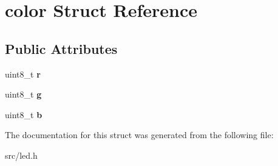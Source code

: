 \hypertarget{structcolor}{}\section{color Struct Reference}
\label{structcolor}
\subsection*{Public Attributes}
\begin{DoxyCompactItemize}
\item 
\hypertarget{structcolor_a7293811e057a838135d916809d231b05}{}uint8\+\_\+t {\bfseries r}\label{structcolor_a7293811e057a838135d916809d231b05}

\item 
\hypertarget{structcolor_ae81805dcec6033d1efa8e2721baee60e}{}uint8\+\_\+t {\bfseries g}\label{structcolor_ae81805dcec6033d1efa8e2721baee60e}

\item 
\hypertarget{structcolor_a883efd73bb99d3727eceb8bfdd620bc8}{}uint8\+\_\+t {\bfseries b}\label{structcolor_a883efd73bb99d3727eceb8bfdd620bc8}

\end{DoxyCompactItemize}


The documentation for this struct was generated from the following file\+:\begin{DoxyCompactItemize}
\item 
src/led.\+h\end{DoxyCompactItemize}
